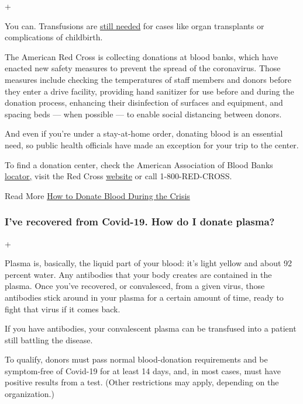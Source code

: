+

You can. Transfusions are
\href{https://docs.google.com/document/d/1Ep_tZsoeCO6fLGDmD58CetFzaKk1uUwkAEoa_CQ1p0U/edit?ts=5f0dc4a0}{still
needed} for cases like organ transplants or complications of childbirth.

The American Red Cross is collecting donations at blood banks, which
have enacted new safety measures to prevent the spread of the
coronavirus. Those measures include checking the temperatures of staff
members and donors before they enter a drive facility, providing hand
sanitizer for use before and during the donation process, enhancing
their disinfection of surfaces and equipment, and spacing beds --- when
possible --- to enable social distancing between donors.

And even if you're under a stay-at-home order, donating blood is an
essential need, so public health officials have made an exception for
your trip to the center.

To find a donation center, check the American Association of Blood Banks
\href{http://www.aabb.org/tm/donation/Pages/Blood-Bank-Locator.aspx}{locator,}
visit the Red Cross \href{https://www.redcrossblood.org/}{website} or
call 1-800-RED-CROSS.

 Read More
\href{https://www.nytimes.com/2020/03/19/well/live/coronavirus-blood-donation.html}{How
to Donate Blood During the Crisis}

\hypertarget{ive-recovered-from-covid-19-how-do-i-donate-plasma}{%
\subsubsection{I've recovered from Covid-19. How do I donate
plasma?}\label{ive-recovered-from-covid-19-how-do-i-donate-plasma}}

+

Plasma is, basically, the liquid part of your blood: it's light yellow
and about 92 percent water. Any antibodies that your body creates are
contained in the plasma. Once you've recovered, or convalesced, from a
given virus, those antibodies stick around in your plasma for a certain
amount of time, ready to fight that virus if it comes back.

If you have antibodies, your convalescent plasma can be transfused into
a patient still battling the disease.

To qualify, donors must pass normal blood-donation requirements and be
symptom-free of Covid-19 for at least 14 days, and, in most cases, must
have positive results from a test. (Other restrictions may apply,
depending on the organization.)

